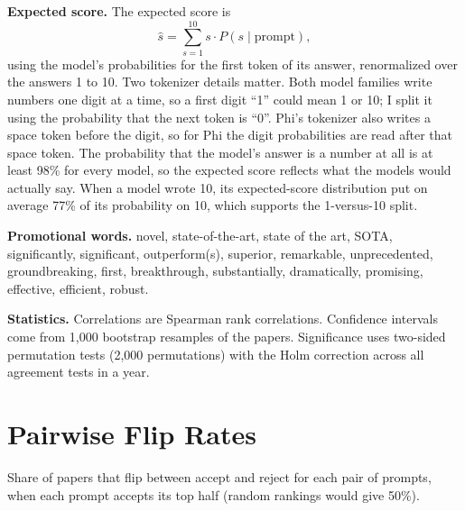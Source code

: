 \documentclass[11pt]{article}
\begin{document}
\textbf{Expected score.} The expected score is
\[
  \hat{s} = \sum_{s=1}^{10} s \cdot P(s \mid \text{prompt}),
\]
using the model's probabilities for the first token of its answer, renormalized over the answers 1 to 10. Two tokenizer details matter. Both model families write numbers one digit at a time, so a first digit ``1'' could mean 1 or 10; I split it using the probability that the next token is ``0''. Phi's tokenizer also writes a space token before the digit, so for Phi the digit probabilities are read after that space token. The probability that the model's answer is a number at all is at least 98\% for every model, so the expected score reflects what the models would actually say. When a model wrote 10, its expected-score distribution put on average 77\% of its probability on 10, which supports the 1-versus-10 split.

\textbf{Promotional words.} novel, state-of-the-art, state of the art, SOTA, significantly, significant, outperform(s), superior, remarkable, unprecedented, groundbreaking, first, breakthrough, substantially, dramatically, promising, effective, efficient, robust.

\textbf{Statistics.} Correlations are Spearman rank correlations. Confidence intervals come from 1,000 bootstrap resamples of the papers. Significance uses two-sided permutation tests (2,000 permutations) with the Holm correction across all agreement tests in a year.

\section{Pairwise Flip Rates}
\label{app:pairwise}
Share of papers that flip between accept and reject for each pair of prompts, when each prompt accepts its top half (random rankings would give 50\%).

\begin{table}[!htbp]
\centering
\small

\caption{Pairwise verdict flip rates. Columns name the two prompts compared.}
\label{tab:pairwise}
\end{table}
\end{document}
